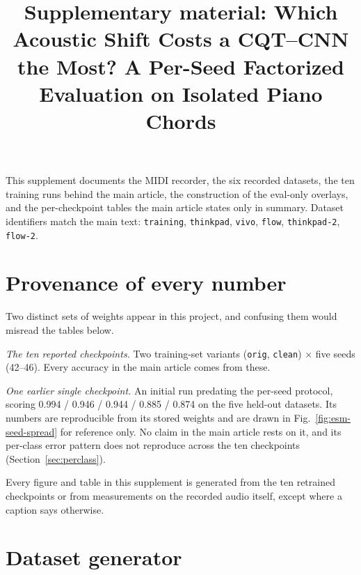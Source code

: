 \documentclass[pdflatex,sn-mathphys-num]{sn-jnl}
\begin{document}
\title[Supplementary material: Which acoustic shift costs a CQT--CNN the most]{Supplementary material: Which Acoustic Shift Costs a CQT--CNN the Most? A Per-Seed Factorized Evaluation on Isolated Piano Chords}

\author*[1]{ }
\author[1]{ }

\maketitle

This supplement documents the MIDI recorder, the six recorded datasets, the ten training runs behind the main article, the construction of the eval-only overlays, and the per-checkpoint tables the main article states only in summary. Dataset identifiers match the main text: \texttt{training}, \texttt{thinkpad}, \texttt{vivo}, \texttt{flow}, \texttt{thinkpad-2}, \texttt{flow-2}.

\section{Provenance of every number}\label{sec:provenance}

Two distinct sets of weights appear in this project, and confusing them would misread the tables below.

\emph{The ten reported checkpoints.} Two training-set variants (\texttt{orig}, \texttt{clean}) $\times$ five seeds (42--46). Every accuracy in the main article comes from these.

\emph{One earlier single checkpoint.} An initial run predating the per-seed protocol, scoring 0.994 / 0.946 / 0.944 / 0.885 / 0.874 on the five held-out datasets. Its numbers are reproducible from its stored weights and are drawn in Fig.~\ref{fig:esm-seed-spread} for reference only. No claim in the main article rests on it, and its per-class error pattern does not reproduce across the ten checkpoints (Section~\ref{sec:perclass}).

Every figure and table in this supplement is generated from the ten retrained checkpoints or from measurements on the recorded audio itself, except where a caption says otherwise.

\section{Dataset generator}\label{sec:generator}
\end{document}
